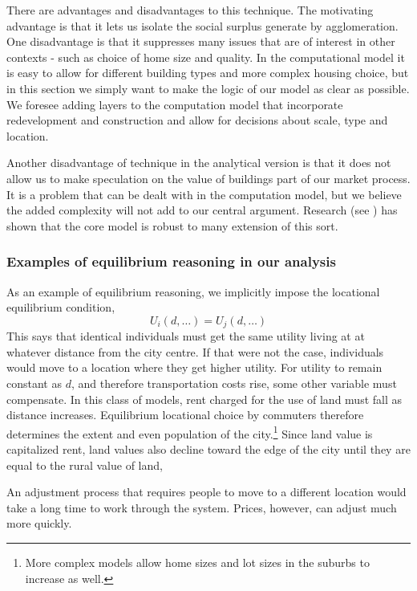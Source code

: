 There are advantages and disadvantages to this technique. The motivating advantage is that it lets us isolate the social surplus generate by agglomeration. One disadvantage is that it suppresses many issues that are of interest in other contexts - such as choice of home size and quality. In the computational model it is easy to allow for different building types and more complex housing choice, but in this section we simply  want to make the logic of our model as clear as possible. We foresee adding layers to the computation model that incorporate redevelopment and construction and allow for decisions about scale, type and location. 

Another disadvantage of technique in the analytical version is that it does not allow us to make speculation on  the value of  buildings part of our market process. It is a problem that can be dealt with in the computation model, but we believe the added complexity will not add to our central argument. Research (see \cite{mcdonaldWilliamAlonsoRichard2007}) has shown  that the core model is robust to many extension of this sort. 

\subsubsection{Examples of  \gls{equilibrium} reasoning in our analysis}
As an example of \gls{equilibrium reasoning},  we implicitly impose the locational equilibrium condition,
\[U_i(d,\dots)=U_j(d, \dots)\]
This says that identical individuals must get the same utility living at at whatever distance from the city centre. If that were not the case, individuals would move to a location where they get higher utility. For utility to remain constant as $d$, and therefore transportation costs  rise, some other variable must compensate. In this class of models, rent charged for the use of land must fall as distance increases. Equilibrium locational choice by commuters therefore determines the extent and even population of the city.\footnote{More complex models allow home sizes and lot sizes in the suburbs to increase as well.} Since land value  is capitalized rent, land values also decline toward the edge of the city until they are equal to the rural value of land, 

An adjustment process that requires people to move to a different location would take a long time to work through the system. Prices, however, can adjust much more quickly.



